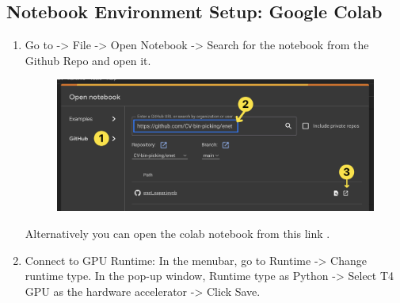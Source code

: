 \subsection*{Notebook Environment Setup: Google Colab}
\begin{enumerate}
	\item Go to \colaburl -> File -> Open Notebook -> Search for the notebook from the Github Repo \segnetrepourl and open it.
	      \begin{figure}[H]
		      \centering
		      \includegraphics[width=450pt]{assets/enet/camvid/open.png}
		      \label{fig:using:test1}
	      \end{figure}
	      Alternatively you can open the colab notebook from this link \enetcolaburl.
	\item Connect to GPU Runtime: In the menubar, go to Runtime -> Change runtime type. In the pop-up window, Runtime type as Python -> Select T4 GPU as the hardware accelerator -> Click Save.


\end{enumerate}
